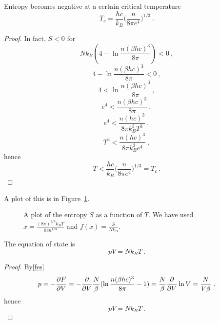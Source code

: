     Entropy becomes negative at a certain critical temperature
    \begin{equation*}
        T_c = \frac{hc}{k_B} \Big (\frac{n}{8\pi e^4} \Big)^{1/3} ~.
    \end{equation*}
    \begin{proof}
        In fact, $S < 0$ for 
        \begin{equation*}
            N k_B (4 - \ln \frac{n (\beta h c)^3}{8\pi} ) < 0 ~,
        \end{equation*}
        \begin{equation*}
            4 - \ln \frac{n (\beta h c)^3}{8\pi} < 0 ~,
        \end{equation*}
        \begin{equation*}
            4 < \ln \frac{n (\beta h c)^3}{8\pi} ~,
        \end{equation*}
        \begin{equation*}
            e^{4} < \frac{n (\beta h c)^3}{8\pi} ~,
        \end{equation*}
        \begin{equation*}
            e^{4} < \frac{n (h c)^3}{8\pi k_B^3 T^3}  ~,
        \end{equation*}
        \begin{equation*}
            T^3 < \frac{n (h c)^3}{8\pi k_B^3 e^4} ~,
        \end{equation*}
        hence 
        \begin{equation*}
            T < \frac{hc}{k_B} \Big (\frac{n}{8\pi e^4} \Big)^{1/3} = T_c ~.
        \end{equation*}
    \end{proof}
    A plot of this is in Figure~\ref{can:ent3}.
    \begin{figure}
        \centering
        \caption{A plot of the entropy $S$ as a function of $T$. We have used $x = \frac{(8 \pi)^{1/3} k_B T}{h c n^{1/3}}$ and $f(x) = \frac{S}{N k_B}$.}
        \label{can:ent3}
    \end{figure}
    
    The equation of state is 
    \begin{equation}\label{idesultra}
        p V = N k_B T ~.
    \end{equation}
    \begin{proof}
        By\eqref{fes}
        \begin{equation*}
            p = - \frac{\partial F}{\partial V} = - \frac{\partial}{\partial V} \frac{N}{\beta} (\ln \frac{n (\beta h c)^3}{8\pi} - 1) = \frac{N}{\beta} \frac{\partial}{\partial V} \ln V = \frac{N}{V \beta} ~,
        \end{equation*}
        hence 
        \begin{equation*}
            p V = N k_B T ~.
        \end{equation*}
    \end{proof}
    
